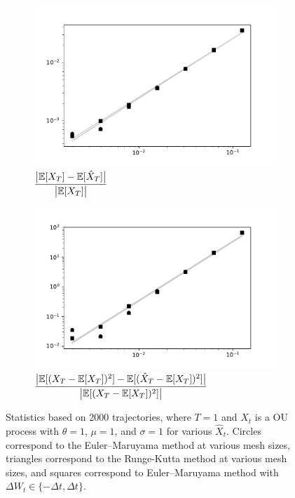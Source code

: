 \documentclass[12pt]{article}
\begin{document}
\begin{figure}[b!]\centering
\begin{subfigure}{.48\textwidth}\centering
    \includegraphics[width=\textwidth]{img/weak_order_2000.pdf}
    \caption{\( \dfrac{\big|\mathbb{E}[X_T] - \mathbb{E}[\hat{X}_T]\big|}{\big|\mathbb{E}[X_T]\big|} \)}
    \label{mean}
\end{subfigure}
\begin{subfigure}{.48\textwidth}\centering
    \includegraphics[width=\textwidth]{img/weak_order_2_mom_2000.pdf}
    \caption{\( \dfrac{\big|\mathbb{E}[(X_T-\mathbb{E}[X_T])^2] - \mathbb{E}[(\hat{X}_T-\mathbb{E}[X_T])^2]\big|}{\big|\mathbb{E}[(X_T-\mathbb{E}[X_T])^2]\big|} \) }
    \label{var}
\end{subfigure}
    \caption{Statistics based on 2000 trajectories, where \( T = 1 \) and \( X_t \) is a OU process with \( \theta = 1 \), \( \mu = 1 \), and \( \sigma = 1 \) for various \( \hat{X}_t \).  Circles correspond to the Euler--Maruyama method at various mesh sizes, triangles correspond to the Runge-Kutta method at various mesh sizes, and squares correspond to Euler--Maruyama method with \( \Delta W_t \in \{-\Delta t, \Delta t\} \). }
\label{weak_order_test}
\end{figure}
\end{document}
